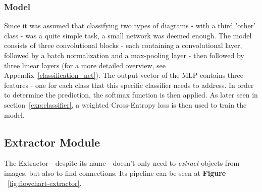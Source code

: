 \documentclass[conference]{IEEEtran}
\begin{document}
\subsubsection{Model}
Since it was assumed that classifying two types of diagrams - with a third 'other' class - was a quite simple task, a small network was deemed enough. The model consists of three convolutional blocks - each containing a convolutional layer, followed by a batch normalization and a max-pooling layer - then followed by three linear layers (for a more detailed overview, see Appendix~\ref{classification_net}). The output vector of the MLP contains three features - one for each class that this specific classifier needs to address. In order to determine the prediction, the softmax function is then applied. As later seen in section~\ref{exp:classifier}, a weighted Cross-Entropy loss is then used to train the model.

\subsection{Extractor Module}

The Extractor - despite its name - doesn't only need to \textit{extract} objects from images, but also to find connections. Its pipeline can be seen at \textbf{Figure} ~\ref{fig:flowchart-extractor}. \\
\end{document}
